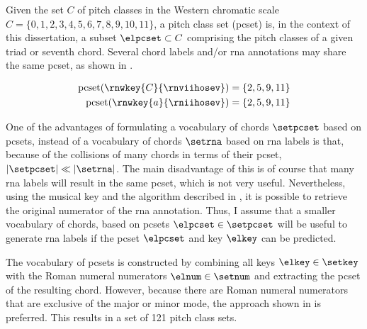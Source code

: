 
Given the set $C$ of pitch classes in the Western chromatic
scale $C = \{0, 1, 2, 3, 4, 5, 6, 7, 8, 9, 10, 11 \}$, a
pitch class set (\gls{pcset}) is, in the context of this
dissertation, a subset $\elpcset \subset C$ comprising the
pitch classes of a given triad or seventh chord. Several
chord labels and/or \gls{rna} annotations may share the same
\gls{pcset}, as shown in .

\begin{equation}
    \label{eq:pcset_collision}
    \begin{split}
        \text{pcset}(\rnwkey{C}{\rnviihosev}) &= \{2, 5, 9, 11 \}\\
        \text{pcset}(\rnwkey{a}{\rniihosev}) &= \{2, 5, 9, 11 \}
    \end{split}
\end{equation}

One of the advantages of formulating a vocabulary of chords
$\setpcset$ based on \gls{pcset}s, instead of a vocabulary
of chords $\setrna$ based on \gls{rna} labels is that,
because of the collisions of many chords in terms of their
\gls{pcset}, $| \setpcset | \ll | \setrna |$. The main
disadvantage of this is of course that many \gls{rna} labels
will result in the same \gls{pcset}, which is not very
useful. Nevertheless, using the musical key and the
algorithm described in
,
it is possible to retrieve the original numerator of the
\gls{rna} annotation. Thus, I assume that a smaller
vocabulary of chords, based on \gls{pcsets} $\elpcset \in
\setpcset$ will be useful to generate \gls{rna} labels if
the \gls{pcset} $\elpcset$ and key $\elkey$ can be
predicted.

The vocabulary of \gls{pcset}s is constructed by combining
all keys $\elkey \in \setkey$ with the Roman numeral
numerators $\elnum \in \setnum$ and extracting the
\gls{pcset} of the resulting chord. However, because there
are Roman numeral numerators that are exclusive of the major
or minor mode, the approach shown in  is
preferred. This results in a set of 121 pitch class sets.


